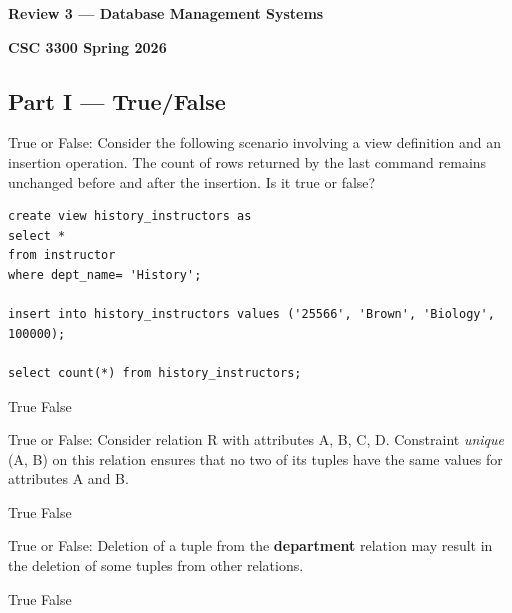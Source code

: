 \documentclass[12pt]{exam}
\begin{document}
\begin{center}
\textbf{\Large Review 3 — Database Management Systems}

\textbf{CSC 3300 \quad Spring 2026}
\end{center}

\begin{questions}
\section*{Part I — True/False}

\begin{minipage}{\linewidth}
\question[3]
True or False: Consider the following scenario involving a view definition and an insertion operation. 
The count of rows returned by the last command remains unchanged before and after the insertion. Is it true or false?\par\vspace{0.5em}
\begin{verbatim}
create view history_instructors as
select * 
from instructor
where dept_name= 'History';

insert into history_instructors values ('25566', 'Brown', 'Biology', 100000);

select count(*) from history_instructors;
\end{verbatim}
\begin{checkboxes}
    \CorrectChoice True
    \choice False
\end{checkboxes}
\end{minipage}\vspace{1em}

\begin{minipage}{\linewidth}
\question[2]
True or False: Consider relation R with attributes A, B, C, D. Constraint \textit{unique} (A, B) on this relation 
ensures that no two of its tuples have the same values for attributes A and B.\par\vspace{0.5em}
\begin{checkboxes}
    \CorrectChoice True
    \choice False
\end{checkboxes}
\end{minipage}\vspace{1em}

\begin{minipage}{\linewidth}
\question[2]
True or False: Deletion of a tuple from the \textbf{department} relation may result in the deletion of some tuples from other relations.\par\vspace{0.5em}
\begin{checkboxes}
    \choice True
    \CorrectChoice False
\end{checkboxes}
\end{minipage}\vspace{1em}


\end{questions}
\end{document}
